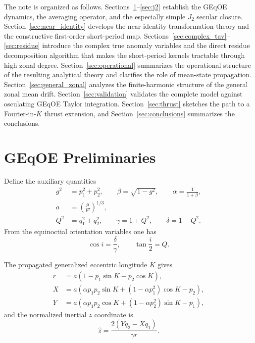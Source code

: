 \documentclass[11pt]{article}
\begin{document}
The note is organized as follows.
Sections~\ref{sec:prelim}--\ref{sec:j2} establish the GEqOE dynamics, the
averaging operator, and the especially simple $J_2$ secular closure.
Section~\ref{sec:near_identity} develops the near-identity transformation
theory and the constructive first-order short-period map.
Sections~\ref{sec:complex_tav}--\ref{sec:residue} introduce the complex
true anomaly variables and the direct residue decomposition algorithm that
makes the short-period kernels tractable through high zonal degree.
Section~\ref{sec:operational} summarizes the operational structure of the
resulting analytical theory and clarifies the role of mean-state propagation.
Section~\ref{sec:general_zonal} analyzes the finite-harmonic structure of
the general zonal mean drift.
Section~\ref{sec:validation} validates the complete model against osculating
GEqOE Taylor integration.
Section~\ref{sec:thrust} sketches the path to a Fourier-in-$K$ thrust
extension, and Section~\ref{sec:conclusions} summarizes the conclusions.

\section{GEqOE Preliminaries}
\label{sec:prelim}

Define the auxiliary quantities
\begin{align}
g^2 &= p_1^2 + p_2^2, \qquad \beta = \sqrt{1-g^2}, \qquad
\alpha = \frac{1}{1+\beta}, \\
a &= \left(\frac{\mu}{\nu^2}\right)^{1/3}, \\
Q^2 &= q_1^2 + q_2^2, \qquad
\gamma = 1 + Q^2, \qquad
\delta = 1 - Q^2.
\end{align}
From the equinoctial orientation variables one has
\begin{equation}
\cos i = \frac{\delta}{\gamma},
\qquad
\tan\frac{i}{2} = Q.
\end{equation}

The propagated generalized eccentric longitude $K$ gives
\begin{align}
r &= a\left(1 - p_1 \sin K - p_2 \cos K\right), \label{eq:rK}\\
X &= a\left(\alpha p_1 p_2 \sin K + (1-\alpha p_1^2)\cos K - p_2\right), \\
Y &= a\left(\alpha p_1 p_2 \cos K + (1-\alpha p_2^2)\sin K - p_1\right),
\end{align}
and the normalized inertial $z$ coordinate is
\begin{equation}
\hat z = \frac{2(Yq_2 - Xq_1)}{\gamma r}. \label{eq:zhat}
\end{equation}
\end{document}

